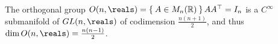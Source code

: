 \documentclass[../main.tex]{subfiles}
\begin{document}
    \begin{theorem}\label{thm:dim-onr}
        The orthogonal group \(\ORTH{n}{\reals}=\Set{A \in M_n(\mathbb{R})}{AA ^{\top}
        =I_n}\) is a \(C^\infty\) submanifold of \(\GL{n}{\reals}\) of codimension 
        \(\frac{n(n+1)}{2}\), and thus \(\dim \ORTH{n}{\reals}=\frac{n(n-1)}{2}\).
    \end{theorem}
%            
\end{document}
